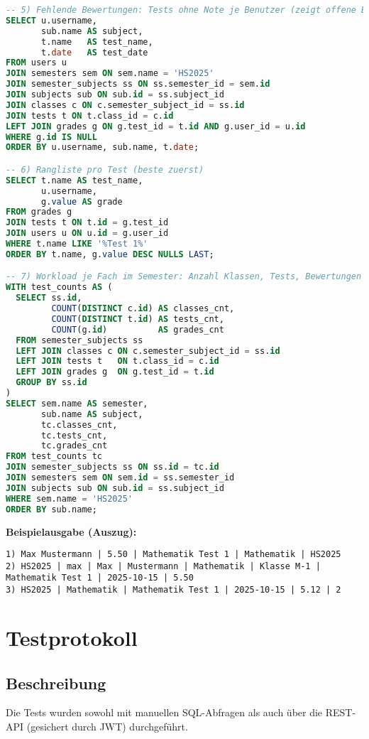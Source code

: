 \documentclass[12pt,a4paper]{article}
\begin{document}
\begin{lstlisting}[language=SQL]
-- 5) Fehlende Bewertungen: Tests ohne Note je Benutzer (zeigt offene Bewertungen)
SELECT u.username,
       sub.name AS subject,
       t.name   AS test_name,
       t.date   AS test_date
FROM users u
JOIN semesters sem ON sem.name = 'HS2025'
JOIN semester_subjects ss ON ss.semester_id = sem.id
JOIN subjects sub ON sub.id = ss.subject_id
JOIN classes c ON c.semester_subject_id = ss.id
JOIN tests t ON t.class_id = c.id
LEFT JOIN grades g ON g.test_id = t.id AND g.user_id = u.id
WHERE g.id IS NULL
ORDER BY u.username, sub.name, t.date;

-- 6) Rangliste pro Test (beste zuerst)
SELECT t.name AS test_name,
       u.username,
       g.value AS grade
FROM grades g
JOIN tests t ON t.id = g.test_id
JOIN users u ON u.id = g.user_id
WHERE t.name LIKE '%Test 1%'
ORDER BY t.name, g.value DESC NULLS LAST;

-- 7) Workload je Fach im Semester: Anzahl Klassen, Tests, Bewertungen
WITH test_counts AS (
  SELECT ss.id,
         COUNT(DISTINCT c.id) AS classes_cnt,
         COUNT(DISTINCT t.id) AS tests_cnt,
         COUNT(g.id)          AS grades_cnt
  FROM semester_subjects ss
  LEFT JOIN classes c ON c.semester_subject_id = ss.id
  LEFT JOIN tests t   ON t.class_id = c.id
  LEFT JOIN grades g  ON g.test_id = t.id
  GROUP BY ss.id
)
SELECT sem.name AS semester,
       sub.name AS subject,
       tc.classes_cnt,
       tc.tests_cnt,
       tc.grades_cnt
FROM test_counts tc
JOIN semester_subjects ss ON ss.id = tc.id
JOIN semesters sem ON sem.id = ss.semester_id
JOIN subjects sub ON sub.id = ss.subject_id
WHERE sem.name = 'HS2025'
ORDER BY sub.name;
    \end{lstlisting}

    \textbf{Beispielausgabe (Auszug):}
    \begin{verbatim}
1) Max Mustermann | 5.50 | Mathematik Test 1 | Mathematik | HS2025
2) HS2025 | max | Max | Mustermann | Mathematik | Klasse M-1 | Mathematik Test 1 | 2025-10-15 | 5.50
3) HS2025 | Mathematik | Mathematik Test 1 | 2025-10-15 | 5.12 | 2
    \end{verbatim}
    \newpage



    \section{Testprotokoll}

    \subsection{Beschreibung}
    Die Tests wurden sowohl mit manuellen SQL-Abfragen als auch über die REST-API (gesichert durch JWT) durchgeführt.
\end{document}
